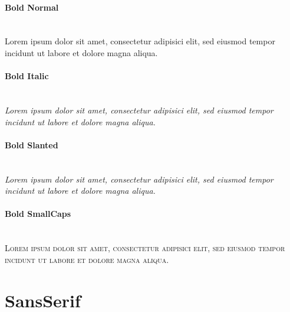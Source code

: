 {\bfseries
\paragraph{Bold Normal}\hfill\\
{
Lorem ipsum dolor sit amet, consectetur adipisici elit, sed eiusmod tempor
incidunt ut labore et dolore magna aliqua.}
\paragraph{Bold Italic}\hfill\\
{\itshape
Lorem ipsum dolor sit amet, consectetur adipisici elit, sed eiusmod tempor
incidunt ut labore et dolore magna aliqua.}
\paragraph{Bold Slanted}\hfill\\
{\slshape
Lorem ipsum dolor sit amet, consectetur adipisici elit, sed eiusmod tempor
incidunt ut labore et dolore magna aliqua.}
\paragraph{Bold SmallCaps}\hfill\\
{\scshape
Lorem ipsum dolor sit amet, consectetur adipisici elit, sed eiusmod tempor
incidunt ut labore et dolore magna aliqua.}
}

\section*{SansSerif}

